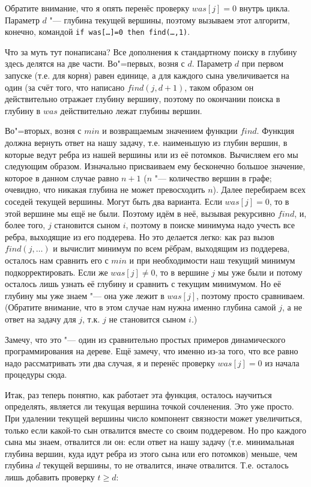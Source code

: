 Обратите внимание, что я опять перенёс проверку $was[j]=0$ внутрь цикла.
Параметр $d$ "--- глубина текущей вершины, поэтому вызываем этот алгоритм, конечно, командой 
\texttt{if was[\dots]=0 then find(\dots,1)}.


Что за муть тут понаписана? Все дополнения к стандартному поиску в глубину здесь делятся на две части. 
Во"=первых, возня с $d$. Параметр $d$ при первом запуске (т.е. для корня)
равен единице, а для каждого сына увеличивается на один (за счёт того, что написано $find(j,d+1)$, 
таком образом он действительно отражает глубину вершину,
поэтому по окончании поиска в глубину в $was$ действительно лежат глубины вершин.

Во"=вторых, возня с $min$ и возвращаемым значением функции $find$. Функция должна вернуть ответ на нашу задачу,
т.е. наименьшую из глубин вершин, в которые ведут ребра из нашей вершины или из её потомков. Вычисляем его мы следующим
образом. Изначально присваиваем ему бесконечно большое значение, которое в данном случае равно $n+1$ ($n$ "---
количество вершин в графе; очевидно, что никакая глубина не может превосходить $n$). Далее перебираем всех соседей
текущей вершины. Могут быть два варианта. Если $was[j]=0$, то в этой вершине мы ещё не были. Поэтому идём в неё,
вызывая рекурсивно $find$, и, более того, $j$ становится сыном $i$, поэтому в поиске минимума надо учесть все
ребра, выходящие из его поддерева. Но это делается легко: как раз вызов $find(j,\dots)$ и вычислит минимум по всем
рёбрам, выходящим из поддерева, осталось нам сравнить его с $min$ и при необходимости наш текущий минимум подкорректировать.
Если же $was[j]\neq 0$, то в вершине $j$ мы уже были и потому осталось лишь узнать её глубину и сравнить с текущим
минимумом. Но её глубину мы уже знаем "--- она уже лежит в $was[j]$, поэтому просто сравниваем. (Обратите внимание,
что в этом случае нам нужна именно глубина самой $j$, а не ответ на задачу для $j$, т.к. $j$ не становится сыном $i$.) 

Замечу, что это "--- один из сравнительно простых примеров динамического программирования на дереве. Ещё замечу,
что именно из-за того, что все равно надо рассматривать эти два случая, я и перенёс проверку $was[j]=0$ из начала процедуры
сюда.

Итак, раз теперь понятно, как работает эта функция, осталось научиться определять, является ли текущая вершина точкой 
сочленения. Это уже просто. При удалении текущей вершины число компонент связности может увеличиться, только
если какой-то сын отвалится вместе со своим поддеревом. Но про каждого сына мы знаем, отвалится ли он:
если ответ на нашу задачу (т.е. минимальная глубина вершин, куда идут ребра из этого сына или его потомков) меньше,
чем глубина $d$ текущей вершины, то не отвалится, иначе отвалится. Т.е. осталось лишь добавить проверку $t\geq d$:

